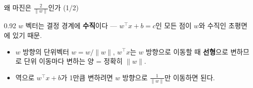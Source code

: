 \begin{frame}{왜 마진은 $\frac{2}{\|w\|}$인가 (1/2)}
\begin{center}\begin{varwidth}{0.92\textwidth}
  $w$ 벡터는 결정 경계에 \textbf{수직}이다 —
  $w^\top x + b = c$인 모든 점이 $w$와 수직인 초평면에 있기 때문.
  \begin{itemize}
    
    
    \item $w$ 방향의 단위벡터 $\hat w = w/\|w\|$,
      $w^\top x$는 $w$ 방향으로 이동할 때 \textbf{선형}으로 변하므로
      단위 이동마다 변하는 양 = 정확히 $\|w\|$.
    \item 역으로 $w^\top x + b$가 1만큼 변하려면
      $w$ 방향으로 $\frac{1}{\|w\|}$만 이동하면 된다.
  \end{itemize}
\end{varwidth}\end{center}
\end{frame}

